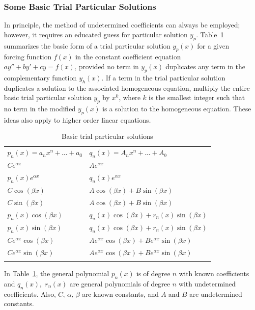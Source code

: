 		
			
			\subsubsection{Some Basic Trial Particular Solutions}
			In principle, the method of undetermined coefficients can always be employed; however, it requires an educated guess for particular solution \(y_p\). Table~\ref{table:particular solutions} summarizes the basic form of  a trial particular solution  $y_p(x)$ for a given forcing function $f(x)$ in the constant coefficient equation $ay'' + by' + cy = f(x)$, provided no term in $y_p(x)$ duplicates any term in the complementary function $y_h(x)$. If a term in the trial particular solution duplicates a solution to the associated homogeneous equation, multiply the entire basic trial particular solution $y_p$  by $x^k$, where $k$ is the smallest integer such that no term in the modified $y_p(x)$ is a solution to  the homogeneous equation. These ideas also apply to higher order linear equations.
			
			\vspace{0.5cm}
			\begin{table}[h]
				\centering
			\begin{tabular}{@{}ll@{}}
				\toprule
				\text{$g(x)$} & \text{Basic form of trial $y_p(x)$} \\
				\midrule
				$ p_n(x)= a_n x^n + \dots + a_0$ & $ q_n(x)= A_n x^n + \dots + A_0$ \\
				$Ce^{\alpha x}$ & $Ae^{\alpha x}$ \\
				$p_n(x) e^{\alpha x}$ & $q_n(x) e^{\alpha x}$ \\
				$C \cos(\beta x)$  & $A \cos(\beta x) + B \sin(\beta x)$ \\
				$C \sin(\beta x)$  & $A \cos(\beta x) + B \sin(\beta x)$ \\
				$p_n(x) \cos(\beta x)$ & $q_n(x) \cos(\beta x) + r_n(x) \sin(\beta x)$ \\
				 $p_n(x) \sin(\beta x)$ & $q_n(x) \cos(\beta x) + r_n(x) \sin(\beta x)$ \\
				$Ce^{\alpha x} \cos(\beta x)$  & $Ae^{\alpha x} \cos(\beta x) + Be^{\alpha x} \sin(\beta x)$ \\
				 $Ce^{\alpha x} \sin(\beta x)$ & $Ae^{\alpha x} \cos(\beta x) + Be^{\alpha x} \sin(\beta x)$ \\
				\bottomrule\\
			\end{tabular}
			\caption{Basic trial particular solutions}
			\label{table:particular solutions}
			\end{table}
			\noindent In Table~\ref{table:particular solutions}, the general polynomial $p_n(x)$ is  of degree $n$ with known coefficients and $q_n(x),$ $r_n(x)$ are general polynomials of degree $n$ with  undetermined coefficients. Also,  $C$, $\alpha$, $\beta$ are known constants, and $A$  and $B$ are undetermined constants.
			
